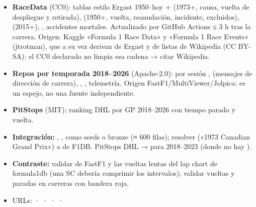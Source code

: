\begin{itemize}
\item \textbf{RaceData} (CC0): tablas estilo Ergast 1950–hoy +  (1973+, causa, vuelta de despliegue y retirada),  (1950+, vuelta, reanudación, incidente, excluidos),  (2015+), , accidentes mortales. Actualizado por GitHub Actions ≤ 3 h tras la carrera. Origen: Kaggle «Formula 1 Race Data» y «Formula 1 Race Events» (jtrotman), que a su vez derivan de Ergast y de listas de Wikipedia (CC BY-SA): el CC0 declarado no limpia esa cadena → citar Wikipedia.
\item \textbf{Repos por temporada 2018–2026} (Apache-2.0): por sesión ,  (mensajes de dirección de carrera), , , telemetría. Origen FastF1/MultiViewer/Jolpica: es un espejo, no una fuente independiente.
\item \textbf{PitStops} (MIT): ranking DHL por GP 2018–2026 con tiempo parado y vuelta.
\item \textbf{Integración:} , ,  como seeds o bronze (≈ 600 filas); resolver  («1973 Canadian Grand Prix») a  de F1DB. PitStops DHL →  para 2018–2023 (donde no hay ).
\item \textbf{Contraste:} validar  de FastF1 y las vueltas lentas del lap chart de formula1db (una SC debería comprimir los intervalos); validar vueltas y paradas en carreras con bandera roja.
\item URLs: \href{https://github.com/TracingInsights/RaceData}{} · \href{https://huggingface.co/datasets/tracinginsights/RaceData}{} · \href{https://github.com/TracingInsights/2026}{} · \href{https://github.com/TracingInsights-Archive/PitStops}{} · \href{https://tracinginsights.com/data/}{}
\end{itemize}

